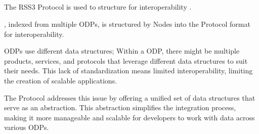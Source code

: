 \subsection{}
\label{subsec:protocol}

The RSS3 Protocol is used to structure  for interoperability \cite{protocol}.

, indexed from multiple \glspl{ODP}, is structured by \glspl{Node} into the \gls{Protocol} format for interoperability.

\glspl{ODP} use different data structures;
Within a \gls{ODP}, there might be multiple products, services, and protocols that leverage different data structures to suit their needs.
This lack of standardization means limited interoperability, limiting the creation of scalable applications.

The \gls{Protocol} addresses this issue by offering a unified set of data structures that serve as an abstraction.
This abstraction simplifies the integration process, making it more manageable and scalable for developers to work with data across various \glspl{ODP}.
